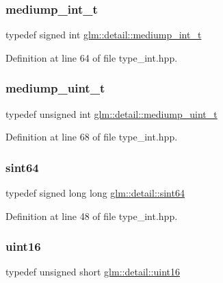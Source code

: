 \subsubsection{\texorpdfstring{mediump\_int\_t}{mediump\_int\_t}}
{\footnotesize\ttfamily typedef signed int \mbox{\hyperlink{namespaceglm_1_1detail_aede0757f19204d1d44f716b3dd66d13c}{glm\+::detail\+::mediump\+\_\+int\+\_\+t}}}



Definition at line 64 of file type\+\_\+int.\+hpp.

\mbox{\label{namespaceglm_1_1detail_a98f572e92099cc1b5740f1ccf1c80f8d}} 
\subsubsection{\texorpdfstring{mediump\_uint\_t}{mediump\_uint\_t}}
{\footnotesize\ttfamily typedef unsigned int \mbox{\hyperlink{namespaceglm_1_1detail_a98f572e92099cc1b5740f1ccf1c80f8d}{glm\+::detail\+::mediump\+\_\+uint\+\_\+t}}}



Definition at line 68 of file type\+\_\+int.\+hpp.

\mbox{\label{namespaceglm_1_1detail_aa9fd5478f3e347aa0b2d1a8bf3408544}} 
\subsubsection{\texorpdfstring{sint64}{sint64}}
{\footnotesize\ttfamily typedef signed long long \mbox{\hyperlink{namespaceglm_1_1detail_aa9fd5478f3e347aa0b2d1a8bf3408544}{glm\+::detail\+::sint64}}}



Definition at line 48 of file type\+\_\+int.\+hpp.

\mbox{\label{namespaceglm_1_1detail_a47b2a7d006d187338e8031a352d1ce56}} 
\subsubsection{\texorpdfstring{uint16}{uint16}}
{\footnotesize\ttfamily typedef unsigned short \mbox{\hyperlink{namespaceglm_1_1detail_a47b2a7d006d187338e8031a352d1ce56}{glm\+::detail\+::uint16}}}



